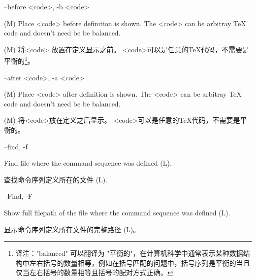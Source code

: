 \documentclass{article}
\newenvironment{options}{%
    \def\cstart{\begingroup\ttfamily\par\noindent\ignorespaces}%
    \def\csep{\endgroup\begingroup\list {}{}\item \relax}%
    \def\cend{\endlist\par\medskip\endgroup\cstart}%
    \cstart
}{%
    \endgroup
}
\begin{document}
\begin{options}
  --before \MacroArgs<code>, -b \MacroArgs<code>     \csep 
(M) Place \MacroArgs<code> before definition is shown. 
The \MacroArgs<code> can be arbitray TeX code and doesn't need be be balanced.

(M) 将\MacroArgs <code> 放置在定义显示之前。 \MacroArgs <code>可以是任意的TeX代码，不需要是平衡的\footnote{译注："balanced" 可以翻译为 "平衡的"，在计算机科学中通常表示某种数据结构中左右括号的数量相等，例如在括号匹配的问题中，括号序列是平衡的当且仅当左右括号的数量相等且括号的配对方式正确。}。
\cend 
\end{options}


\begin{options}
  --after  \MacroArgs<code>, -a \MacroArgs<code>     \csep 
(M) 
Place \MacroArgs<code> after definition is shown.
  The \MacroArgs<code> can be arbitray TeX code and doesn't need be be balanced.
  
(M) 将\MacroArgs <code>放在定义之后显示。
\MacroArgs <code>可以是任意的TeX代码，不需要是平衡的。
\cend
\end{options}

\begin{options}
  --find, -f                                         \csep 
Find file where the command sequence was defined (L).

查找命令序列定义所在的文件 (L).
\cend
\end{options}

\begin{options}
--Find, -F                                         \csep 
Show full filepath of the file where the command sequence was defined (L).

显示命令序列定义所在文件的完整路径 (L)。
\cend
\end{options}
\end{document}
